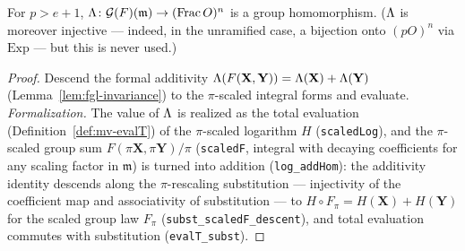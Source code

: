 \begin{theorem}
\label{thm:log-iso}
\leanok
{}
For $p > e + 1$, $\Lambda \colon \mathcal G(F)(\mathfrak m) \to (\mathrm{Frac}\,O)^n$ is a
group homomorphism. ($\Lambda$ is moreover injective --- indeed, in the unramified case, a
bijection onto $(pO)^n$ via $\mathrm{Exp}$ --- but this is never used.)
\end{theorem}
\begin{proof}
\leanok
Descend the formal additivity $\Lambda(F(\mathbf X,\mathbf Y)) = \Lambda(\mathbf X) +
\Lambda(\mathbf Y)$ (Lemma~\ref{lem:fgl-invariance}) to the $\pi$-scaled integral forms and
evaluate. \emph{Formalization.} The value of $\Lambda$ is realized as the total evaluation
(Definition~\ref{def:mv-evalT}) of the $\pi$-scaled logarithm $H$ (\texttt{scaledLog}), and
the $\pi$-scaled group sum $F(\pi\mathbf X, \pi\mathbf Y)/\pi$ (\texttt{scaledF}, integral
with decaying coefficients for any scaling factor in $\mathfrak m$) is turned into addition
(\texttt{log\_addHom}): the additivity identity descends along the $\pi$-rescaling
substitution --- injectivity of the coefficient map and associativity of substitution --- to
$H\circ F_\pi = H(\mathbf X) + H(\mathbf Y)$ for the scaled group law $F_\pi$
(\texttt{subst\_scaledF\_descent}), and total evaluation commutes with substitution
(\texttt{evalT\_subst}).
\end{proof}

